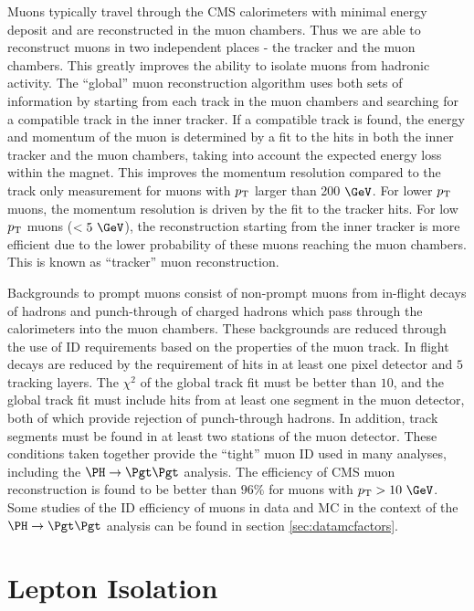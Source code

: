 Muons typically travel through the CMS calorimeters with minimal energy deposit
and are reconstructed in the muon chambers. Thus we are able to reconstruct
muons in two independent places - the tracker and the muon chambers. This
greatly improves the ability to isolate muons from hadronic activity. The
``global'' muon reconstruction algorithm \cite{MuonReco} uses both sets of information by
starting from each track in the muon chambers and searching for a compatible
track in the inner tracker. If a compatible track is found, the energy and
momentum of the muon is determined by a fit to the hits in both the inner
tracker and the muon chambers, taking into account the expected energy loss
within the magnet. This improves the momentum resolution compared to
the track only measurement for muons with $p_{\mathrm{T}}$ larger than 200 $\GeV$. For
lower $p_{\mathrm{T}}$ muons, the momentum resolution is driven by the fit to the tracker
hits. For low $p_{\mathrm{T}}$ muons ($< 5~\GeV$), the reconstruction starting from the inner
tracker is more efficient due to the lower probability of these muons reaching
the muon chambers. This is known as ``tracker'' muon reconstruction.  

Backgrounds to prompt muons consist of non-prompt muons from in-flight decays of
hadrons and punch-through of charged hadrons which pass through the calorimeters
into the muon chambers. These backgrounds are reduced through the use of ID
requirements based on the properties of the muon track. In flight decays are
reduced by the requirement of hits in at least one pixel detector and $5$
tracking layers. The $\chi^{2}$ of the global track fit must be better than
$10$, and the global track fit must include hits from at least one segment in
the muon detector, both of which provide rejection of punch-through hadrons. In
addition, track segments must be found in at least two stations of the muon
detector. These conditions taken together provide the ``tight'' muon ID used in
many analyses, including the $\PH\to\Pgt\Pgt$ analysis.
The efficiency of CMS muon reconstruction is found to be better
than $96\%$ for muons with $\pt > 10~\GeV$. Some studies of the ID efficiency of
muons in data and \ac{MC} in the context of the $\PH \to \Pgt\Pgt$ analysis can
be found in section \ref{sec:datamcfactors}.

\section{Lepton Isolation}
\label{sec:leptonisolation}

